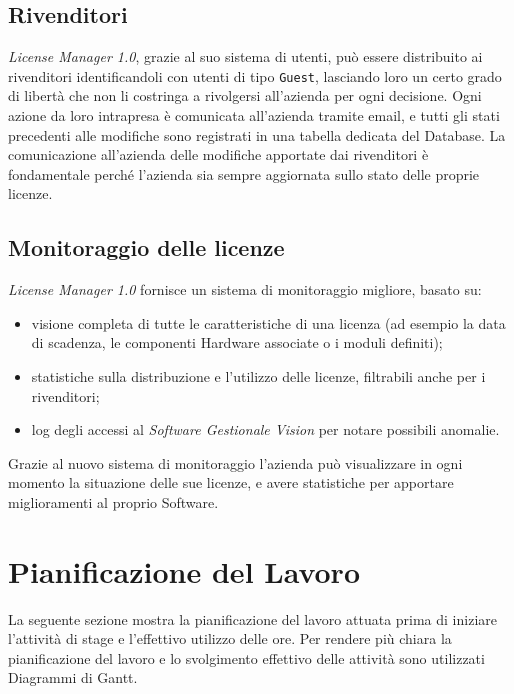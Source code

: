 \subsection{Rivenditori}

\textit{License Manager 1.0}, grazie al suo sistema di utenti, può essere distribuito ai rivenditori identificandoli con utenti di tipo \texttt{Guest}, lasciando loro un certo grado di libertà che non li costringa a rivolgersi all’azienda per ogni decisione. Ogni azione da loro intrapresa è comunicata all’azienda tramite email, e tutti gli stati precedenti alle modifiche sono registrati in una tabella dedicata del Database. La comunicazione all'azienda delle modifiche apportate dai rivenditori è fondamentale perché l'azienda sia sempre aggiornata sullo stato delle proprie licenze.

\subsection{Monitoraggio delle licenze}

\textit{License Manager 1.0} fornisce un sistema di monitoraggio migliore, basato su:
\begin{itemize}
\item visione completa di tutte le caratteristiche di una licenza (ad esempio la data di scadenza, le componenti Hardware associate o i moduli definiti);
\item statistiche sulla distribuzione e l'utilizzo delle licenze, filtrabili anche per i rivenditori;
\item log degli accessi al \textit{Software Gestionale Vision} per notare possibili anomalie.
\end{itemize}
Grazie al nuovo sistema di monitoraggio l'azienda può visualizzare in ogni momento la situazione delle sue licenze, e avere statistiche per apportare miglioramenti al proprio Software.


\newpage
\section{Pianificazione del Lavoro}

La seguente sezione mostra la pianificazione del lavoro attuata prima di iniziare l'attività di stage e l'effettivo utilizzo delle ore. Per rendere più chiara la pianificazione del lavoro e lo svolgimento effettivo delle attività sono utilizzati Diagrammi di Gantt.
\newpage

